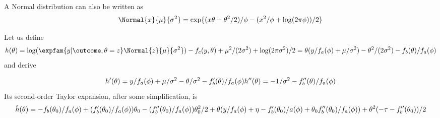 A Normal distribution can also be written as
$$
\Normal{x}{\mu}{\sigma^2} = \exp\{(x\theta - \theta^2/2)/\phi - (x^2/\phi + \log(2\pi\phi))/2\}
$$

Let us define
$$
h(\theta)= \log(\expfam{y|\outcome, \theta=z} \Normal{z}{\mu}{\sigma^2}) - f_c(y, \theta) +
		\mu^2/(2\sigma^2) + \log(2\pi\sigma^2)/2\\
		=\theta(y/f_a(\phi) + \mu/\sigma^2) - \theta^2/(2\sigma^2) - f_b(\theta)/f_a(\phi)
$$
and derive


$$
h'(\theta) = y/f_a(\phi) + \mu/\sigma^2 - \theta/\sigma^2 - f'_b(\theta)/f_a(\phi)\\
h''(\theta) = -1/\sigma^2 - f''_b(\theta)/f_a(\phi)
$$
Its second-order Taylor expansion, after some simplification, is
$$
\tilde h(\theta) = -f_b(\theta_0)/f_a(\phi) + (f'_b(\theta_0)/f_a(\phi))\theta_0 - (f''_b(\theta_0)/f_a(\phi))\theta_0^2/2\\
	+\theta (y/f_a(\phi) + \eta - f'_b(\theta_0)/a(\phi) + \theta_0 f''_b(\theta_0)/f_a(\phi))\\
	+\theta^2(-\tau - f''_b(\theta_0))/2
$$
